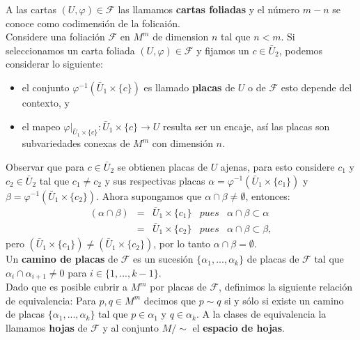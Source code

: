 \documentclass[a4paper,10pt]{book}
\begin{document}
A las cartas $(U,\varphi)\in\mathcal{F}$ las llamamos {\bfseries cartas foliadas} y el n\'umero $m-n$ se conoce como codimensi\'on de la folicai\'on.\\

Considere una foliaci\'on $\mathcal{F}$ en $M^{m}$ de dimension $n$ tal que $n<m$. Si seleccionamos un carta foliada $(U,\varphi)\in\mathcal{F}$ y fijamos un $c\in\bar{U}_{2}$, podemos considerar lo siguiente:
\begin{itemize}
	\item el conjunto $\varphi^{-1}(\bar{U}_{1}\times\{c\})$ es llamado {\bfseries placas} de $U$ o de $\mathcal{F}$ esto depende del contexto, y        
	\item el mapeo $\varphi|_{\bar{U}_{1}\times\{c\}}:\bar{U}_{1}\times\{c\}\to U$ resulta ser un encaje, as\'i las placas son subvariedades conexas de $M^{m}$ con dimensi\'on $n$.
\end{itemize}

Observar que para $c\in\bar{U}_{2}$ se obtienen placas de $U$ ajenas, para esto considere $c_{1}$ y $c_{2}\in\bar{U}_{2}$ tal que $c_{1}\neq c_{2}$ y sus respectivas placas $\alpha=\varphi^{-1}(\bar{U}_{1}\times\{c_{1}\})$ y $\beta=\varphi^{-1}(\bar{U}_{1}\times\{c_{2}\})$. Ahora supongamos que $\alpha\cap\beta\neq\emptyset$, entonces:
\[ \begin{array}{ccccc}
	(\alpha\cap\beta) & = & \bar{U}_{1}\times\{c_{1}\} & pues & \alpha\cap\beta\subset\alpha \\  
					  & = & \bar{U}_{1}\times\{c_{2}\} & pues & \alpha\cap\beta\subset\beta,  
   \end{array} \]
pero $(\bar{U}_{1}\times\{c_{1}\})\neq(\bar{U}_{1}\times\{c_{2}\})$, por lo tanto $\alpha\cap\beta=\emptyset$. \\

Un {\bfseries camino de placas} de $\mathcal{F}$ es un sucesi\'on $\{\alpha_{1},...,\alpha_{k}\}$ de placas de $\mathcal{F}$ tal que $\alpha_{i}\cap\alpha_{i+1}\neq 0$ para $i\in\{1,...,k-1\}$.\\ 

Dado que es posible cubrir a $M^{m}$ por placas de $\mathcal{F}$, definimos la siguiente relaci\'on de equivalencia: Para $p,q\in M^{m}$ decimos que $p\sim q$ si y s\'olo si existe un camino de placas $\{\alpha_{1},...,\alpha_{k}\}$ tal que $p\in\alpha_{1}$ y $q\in\alpha_{k}$. A la clases de equivalencia la llamamos {\bfseries hojas} de $\mathcal{F}$ y al conjunto $M/\sim$ el {\bfseries espacio de hojas}. \\
\end{document}
